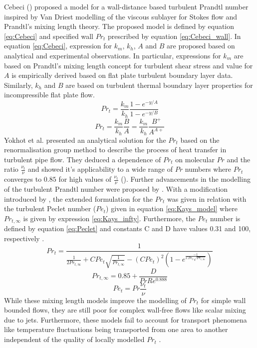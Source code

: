 \noindent Cebeci (\cite{Cebeci1973}) proposed a model for a wall-distance based turbulent Prandtl number inspired by Van Driest modelling of the viscous sublayer for Stokes flow and Prandtl's mixing length theory. The proposed model is defined by equation \ref{eq:Cebeci} and specified wall $Pr_{t}$ prescribed by equation \ref{eq:Cebeci_wall}. In equation \ref{eq:Cebeci}, expression for $k_{m}$, $k_{h}$, $A$ and $B$ are proposed based on analytical and experimental observations. In particular, expressions for $k_{m}$ are based on Prandtl's mixing length concept for turbulent shear stress and value for $A$ is empirically derived based on flat plate turbulent boundary layer data. Similarly, $k_{h}$ and $B$ are based on turbulent thermal boundary layer properties for incompressible flat plate flow.
\begin{equation}
    \label{eq:Cebeci}
    Pr_{t} = \frac{k_{m}}{k_{h}}\frac{1-e^{-y/A}}{1-e^{-y/B}}
\end{equation}
\begin{equation}
    \label{eq:Cebeci_wall}
    Pr_{t} = \frac{k_{m}}{k_{h}}\frac{B}{A} = \frac{k_{m}}{k_{h}}\frac{B^{+}}{A^{A+}}
\end{equation}
Yokhot et al. \cite{Yakhot1987} presented an analytical solution for the $Pr_{t}$ based on the renormalisation group method to describe the process of heat transfer in turbulent pipe flow. They deduced a dependence of $Pr_{t}$ on molecular $Pr$ and the ratio $\frac{\nu_{t}}{\nu}$ and showed it's applicability to a wide range of $Pr$ numbers where $Pr_{t}$ converges to $0.85$ for high values of $\frac{\nu_{t}}{\nu}$ (\cite{Srinivasan2011}). Further advancements in the modelling of the turbulent Prandtl number were proposed by \cite{Kays1993}. With a modification introduced by \cite{Weigand1997},  the extended formulation for the $Pr_{t}$ was given in relation with the turbulent Peclet number ($Pe_{t}$) given in equation \ref{eq:Kays_model} where $Pr_{t,\infty}$ is given by expression \ref{eq:Kays_infty}. Furthermore, the $Pe_{t}$ number is defined by equation \ref{eq:Peclet} and constants C and D have values 0.31 and 100, respectively \cite{Srinivasan2011}. 
\begin{equation}
    \label{eq:Kays_model}
    Pr_{t} = \frac{1}{\frac{1}{2 Pr_{t,\infty}} + C Pe_{t}\sqrt{\frac{1}{Pr_{t,\infty}}} - (C Pe_{t})^{2}\left(1-e^{\frac{-1}{C Pe_{t}\sqrt{Pr_{t,\infty}}}} \right)}
\end{equation}
\begin{equation}
    \label{eq:Kays_infty}
    Pr_{t,\infty} = 0.85 + \frac{D}{Pr Re^{0.888}}
\end{equation}    
\begin{equation}
    \label{eq:Peclet}
    Pe_{t} = Pr\frac{\nu_{t}}{\nu}
\end{equation}
While these mixing length models improve the modelling of $Pr_{t}$ for simple wall bounded flows, they are still poor for complex wall-free flows like scalar mixing due to jets. Furthermore, these models fail to account for transport phenomena like temperature fluctuations being transported from one area to another independent of the quality of locally modelled $Pr_{t}$ \citep{Grotzbach2007}.

